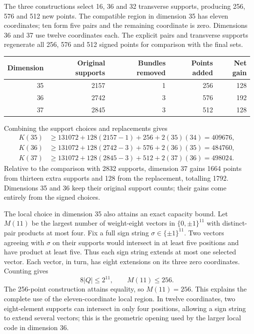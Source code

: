 The three constructions select 16, 36 and 32 transverse supports,
producing 256, 576 and 512 new points.
The compatible region in dimension 35 has eleven coordinates; ten form
five pairs and the remaining coordinate is zero. Dimensions 36 and 37
use twelve coordinates each. The explicit pairs and transverse supports
regenerate all 256, 576 and 512 signed points for comparison with the final sets.
\begin{center}
\begin{minipage}{\linewidth}\centering
{}
\label{tab:signed-replacements}
\begin{tabular}{rrrrr}
\toprule
Dimension & Original supports & Bundles removed & Points added & Net gain\\
\midrule
35&2157&1&256&128\\
36&2742&3&576&192\\
37&2845&3&512&128\\
\bottomrule
\end{tabular}
\end{minipage}
\end{center}
Combining the support choices and replacements gives
\begin{align*}
K(35)&\ge131072+128(2157-1)+256+2(35)(34)=409676,\\
K(36)&\ge131072+128(2742-3)+576+2(36)(35)=484760,\\
K(37)&\ge131072+128(2845-3)+512+2(37)(36)=498024.
\end{align*}
Relative to the comparison with 2832 supports, dimension 37 gains 1664
points from thirteen extra supports and 128 from the replacement, totalling
1792. Dimensions 35 and 36 keep their original support counts; their
gains come entirely from the signed choices.

The local choice in dimension 35 also attains an exact capacity bound.
Let $M(11)$ be the largest number of weight-eight vectors in
$\{0,\pm1\}^{11}$ with distinct-pair products at most four.
Fix a full sign string $\sigma\in\{\pm1\}^{11}$. Two vectors agreeing
with $\sigma$ on their supports would intersect in at least five
positions and have product at least five. Thus each sign string
extends at most one selected vector. Each vector, in turn, has eight
extensions on its three zero coordinates. Counting gives
\[
8|Q|\le2^{11},\qquad M(11)\le256.
\]
The 256-point construction attains equality, so $M(11)=256$.
This explains the complete use of the eleven-coordinate local region.
In twelve coordinates, two eight-element supports can intersect in
only four positions, allowing a sign string to extend several vectors;
this is the geometric opening used by the larger local code in
dimension 36.

